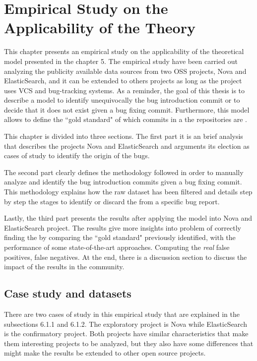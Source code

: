\documentclass[a4paper, 12pt]{book}
\begin{document}
\cleardoublepage
\chapter{Empirical Study on the Applicability of the Theory}
\label{chap:application}
This chapter presents an empirical study on the applicability of the theoretical model presented in the chapter 5. The empirical study have been carried out analyzing the publicity available data sources from two OSS projects, Nova and ElasticSearch, and it can be extended to others projects as long as the project uses VCS and bug-tracking systems. As a reminder, the goal of this thesis is to describe a model to identify unequivocally the bug introduction commit or to decide that it does not exist given a bug fixing commit. Furthermore, this model allows to define the ``gold standard" of which commits in a the repositories are \BIC. 

This chapter is divided into three sections. The first part it is an brief analysis that describes the projects Nova and ElasticSearch and arguments its election as cases of study to identify the origin of the bugs.

The second part clearly defines the methodology followed in order to manually analyze and identify the bug introduction commits given a bug fixing commit. This methodology explains how the raw dataset has been filtered and details step by step the stages to identify or discard the \BIC from a specific bug report.  

Lastly, the third part presents the results after applying the model into Nova and ElasticSearch project. The results give more insights into problem of correctly finding the \BIC by comparing the ``gold standard" previously identified, with the performance of some state-of-the-art approaches. Computing  the \emph{real} false positives, false negatives. At the end, there is a discussion section to discuss the impact of the results in the community.  

\section{Case study and datasets}
\label{sec:case}
There are two cases of study in this empirical study that are explained in the subsections 6.1.1 and 6.1.2. The exploratory project is Nova while ElasticSearch is the confirmatory project. Both projects have similar characteristics that make them interesting projects to be analyzed, but they also have some differences that might make the results be extended to other open source projects.  
\end{document}

